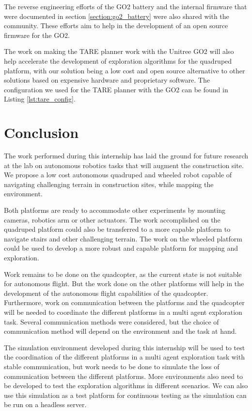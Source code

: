 \documentclass[12pt]{article}
\begin{document}
    The reverse engineering efforts of the GO2 battery and the internal firmware that were documented in section \ref{section:go2_battery} were also shared with the community. These efforts aim to help in the development of an open source firmware for the GO2.

    The work on making the TARE planner work with the Unitree GO2 will also help accelerate the development of exploration algorithms for the quadruped platform, with our solution being a low cost and open source alternative to other solutions based on expensive hardware and proprietary software. The configuration we used for the TARE planner with the GO2 can be found in Listing \ref{lst:tare_config}.



\newpage
\section{Conclusion}

    The work performed during this internship has laid the ground for future research at the lab on autonomous robotics tasks that will augment the construction site. We propose a low cost autonomous quadruped and wheeled robot capable of navigating challenging terrain in construction sites, while mapping the environment.

    Both platforms are ready to accommodate other experiments by mounting cameras, robotics arm or other actuators. The work accomplished on the quadruped platform could also be transferred to a more capable platform to navigate stairs and other challenging terrain. The work on the wheeled platform could be used to develop a more robust and capable platform for mapping and exploration.

    Work remains to be done on the quadcopter, as the current state is not suitable for autonomous flight. But the work done on the other platforms will help in the development of the autonomous flight capabilities of the quadcopter. Furthermore, work on communication between the platforms and the quadcopter will be needed to coordinate the different platforms in a multi agent exploration task. Several communication methods were considered, but the choice of communication method will depend on the environment and the task at hand.

    The simulation environment developed during this internship will be used to test the coordination of the different platforms in a multi agent exploration task with stable communication, but work needs to be done to simulate the loss of communication between the different platforms. More environments also need to be developed to test the exploration algorithms in different scenarios. We can also use this simulation as a test platform for continuous testing as the simulation can be run on a headless server.
\end{document}
